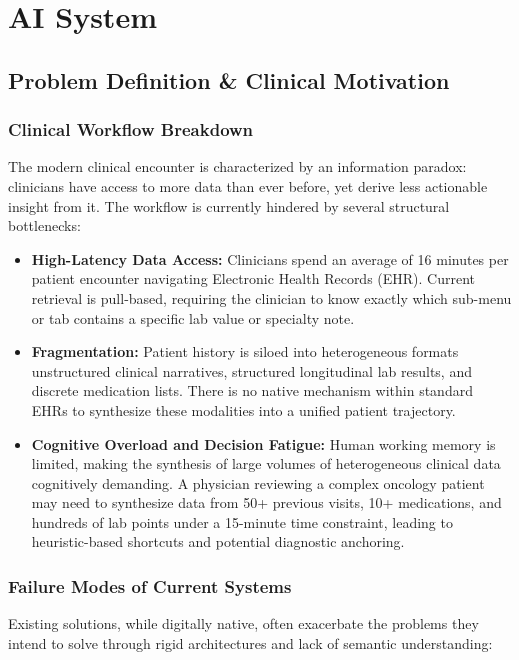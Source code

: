 \chapter{AI System}
\label{chap:AI}

\section{Problem Definition \& Clinical Motivation} 

\subsection{Clinical Workflow Breakdown} The modern clinical encounter is characterized by an information paradox: clinicians have access to more data than ever before, yet derive less actionable insight from it. The workflow is currently hindered by several structural bottlenecks:

\begin{itemize} \item \textbf{High-Latency Data Access:} Clinicians spend an average of 16 minutes per patient encounter navigating Electronic Health Records (EHR). Current retrieval is pull-based, requiring the clinician to know exactly which sub-menu or tab contains a specific lab value or specialty note. \item \textbf{Fragmentation:} Patient history is siloed into heterogeneous formats unstructured clinical narratives, structured longitudinal lab results, and discrete medication lists. There is no native mechanism within standard EHRs to synthesize these modalities into a unified patient trajectory. \item \textbf{Cognitive Overload and Decision Fatigue:} Human working memory is limited, making the synthesis of large volumes of heterogeneous clinical data cognitively demanding. A physician reviewing a complex oncology patient may need to synthesize data from 50+ previous visits, 10+ medications, and hundreds of lab points under a 15-minute time constraint, leading to heuristic-based shortcuts and potential diagnostic anchoring. \end{itemize}

\subsection{Failure Modes of Current Systems} Existing solutions, while digitally native, often exacerbate the problems they intend to solve through rigid architectures and lack of semantic understanding:

